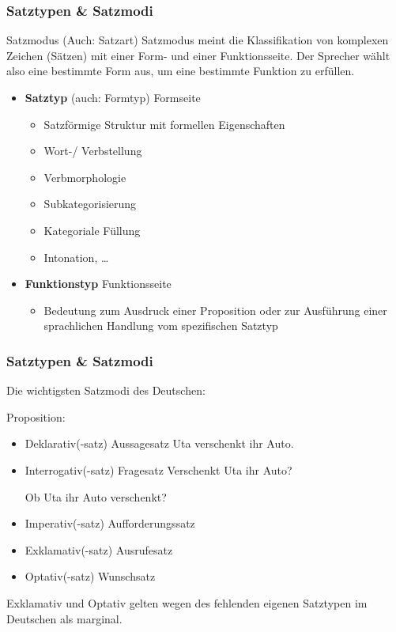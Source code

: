 \begin{frame}
\frametitle{Satztypen \& Satzmodi}

\begin{block}{Satzmodus (Auch: Satzart)}
Satzmodus meint die Klassifikation von komplexen Zeichen (Sätzen) mit einer Form- und einer Funktionsseite. Der Sprecher wählt also eine bestimmte Form aus, um eine bestimmte Funktion zu erfüllen.
\end{block}

\begin{itemize}
	\item \textbf{Satztyp} (auch: Formtyp) \ras Formseite
	\begin{itemize}
		\item Satzförmige Struktur mit formellen Eigenschaften
		\item Wort-/ Verbstellung
		\item Verbmorphologie
		\item Subkategorisierung
		\item Kategoriale Füllung
		\item Intonation, \dots
	\end{itemize}
	\item \textbf{Funktionstyp} \ras Funktionsseite
	\begin{itemize}
		\item Bedeutung zum Ausdruck einer Proposition oder zur Ausführung einer sprachlichen Handlung vom spezifischen Satztyp
	\end{itemize}
\end{itemize}

\end{frame}


\begin{frame}
\frametitle{Satztypen \& Satzmodi}

Die wichtigsten Satzmodi des Deutschen:

\ea Proposition: 
\z

\begin{itemize}
	\item Deklarativ(-satz) \ras Aussagesatz
	\ea Uta verschenkt ihr Auto.
	\z
	
	\item Interrogativ(-satz) \ras Fragesatz
	\ea Verschenkt Uta ihr Auto?
	\z
	
	\ea Ob Uta ihr Auto verschenkt?
	\z
	
	\item Imperativ(-satz) \ras Aufforderungssatz
	\item Exklamativ(-satz) \ras Ausrufesatz
	\item Optativ(-satz) \ras Wunschsatz
\end{itemize}

Exklamativ und Optativ gelten wegen des fehlenden eigenen Satztypen im Deutschen als marginal.


\end{frame}


